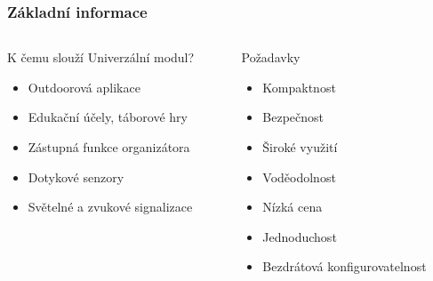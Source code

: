 \documentclass[%
  12pt,       				%
	t,                  %
	aspectratio=1610,   %
	unicode,						%
]{beamer}				    	%
\begin{document}
\disablenavigationsymbols

\maketitle

\begin{frame} 
	\frametitle{Základní informace}
	\begin{columns}[T] 								%
		\begin{column}{0.5\textwidth}		%
			K čemu slouží Univerzální modul?
			\begin{itemize}
				\item Outdoorová aplikace
				\item Edukační účely, táborové hry
				\item Zástupná funkce organizátora
				\item Dotykové senzory
				\item Světelné a zvukové signalizace
			\end{itemize}
		\end{column}
		\begin{column}{0.5\textwidth}		%
				Požadavky
					\begin{itemize}
						\item Kompaktnost
						\item Bezpečnost
						\item Široké využití
						\item Voděodolnost
						\item Nízká cena
						\item Jednoduchost
						\item Bezdrátová konfigurovatelnost
					\end{itemize}
		\end{column}
	\end{columns}	
\end{frame}
\end{document}
